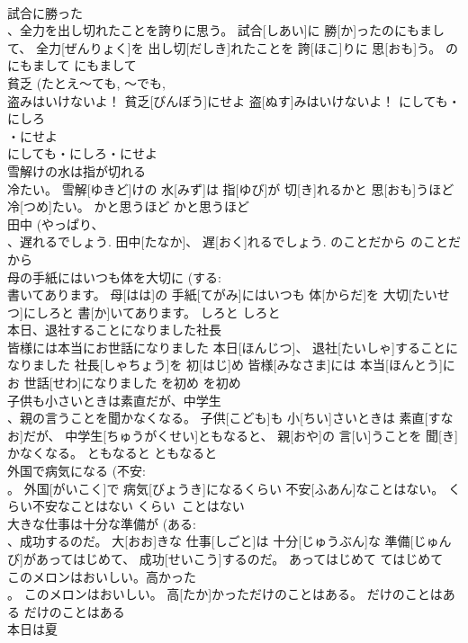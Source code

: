 \documentclass[8pt]{extreport}
\begin{document}
\begin{CJK}{UTF8}{min}
\\	試合に勝った
\\	、全力を出し切れたことを誇りに思う。	試合[しあい]に 勝[か]ったのにもまして、 全力[ぜんりょく]を 出し切[だしき]れたことを 誇[ほこ]りに 思[おも]う。	のにもまして	にもまして	
\\	貧乏 (たとえ～ても, ～でも, 
\\	盗みはいけないよ！	貧乏[びんぼう]にせよ 盗[ぬす]みはいけないよ！	にしても・にしろ
\\	・にせよ
\\	にしても・にしろ・にせよ	
\\	雪解けの水は指が切れる 
\\	冷たい。	雪解[ゆきど]けの 水[みず]は 指[ゆび]が 切[き]れるかと 思[おも]うほど 冷[つめ]たい。	かと思うほど	かと思うほど	
\\	田中 (やっぱり、
\\	、遅れるでしょう.	田中[たなか]、 遅[おく]れるでしょう.	のことだから	のことだから	
\\	母の手紙にはいつも体を大切に (する: 
\\	書いてあります。	母[はは]の 手紙[てがみ]にはいつも 体[からだ]を 大切[たいせつ]にしろと 書[か]いてあります。	しろと	しろと	
\\	本日、退社することになりました社長 
\\	皆様には本当にお世話になりました	本日[ほんじつ]、 退社[たいしゃ]することになりました 社長[しゃちょう]を 初[はじ]め 皆様[みなさま]には 本当[ほんとう]にお 世話[せわ]になりました	を初め	を初め	
\\	子供も小さいときは素直だが、中学生 
\\	、親の言うことを聞かなくなる。	子供[こども]も 小[ちい]さいときは 素直[すなお]だが、 中学生[ちゅうがくせい]ともなると、 親[おや]の 言[い]うことを 聞[き]かなくなる。	ともなると	ともなると	
\\	外国で病気になる (不安: 
\\	。	外国[がいこく]で 病気[びょうき]になるくらい 不安[ふあん]なことはない。	くらい不安なことはない	くらい~ことはない	
\\	大きな仕事は十分な準備が (ある: 
\\	、成功するのだ。	大[おお]きな 仕事[しごと]は 十分[じゅうぶん]な 準備[じゅんび]があってはじめて、 成功[せいこう]するのだ。	あってはじめて	てはじめて	
\\	このメロンはおいしい。高かった 
\\	。	このメロンはおいしい。 高[たか]かっただけのことはある。	だけのことはある	だけのことはある	
\\	本日は夏 

\end{CJK}
\end{document}
